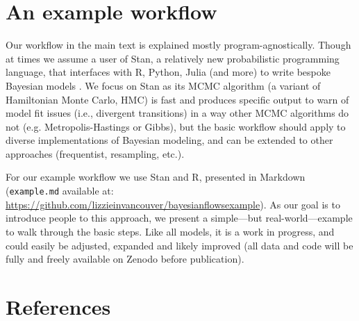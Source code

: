 \documentclass[11pt]{article}
\begin{document}
\section*{An example workflow}

Our workflow in the main text is explained mostly program-agnostically. Though at times we assume a user of \textsf{Stan}, a relatively new probabilistic programming language, that interfaces with \textsf{R, Python, Julia} (and more) to write bespoke Bayesian models \citep{Carpenter:2017stan}. We focus on \textsf{Stan} as its MCMC algorithm (a variant of Hamiltonian Monte Carlo, HMC) is fast and produces specific output to warn of model fit issues (i.e., divergent transitions) in a way other MCMC algorithms do not (e.g. Metropolis-Hastings or Gibbs), but the basic workflow should apply to diverse implementations of Bayesian modeling, and can be extended to other approaches (frequentist, resampling, etc.). 

For our example workflow we use \textsf{Stan} and \textsf{R}, presented in Markdown (\verb|example.md| available at: \url{https://github.com/lizzieinvancouver/bayesianflowsexample}). As our goal is to introduce people to this approach, we present a simple---but real-world---example to walk through the basic steps. Like all models, it is a work in progress, and could easily be adjusted, expanded and likely improved (all data and code will be fully and freely available on Zenodo before publication).

\section*{References}
\vspace{-5ex}

\end{document}
